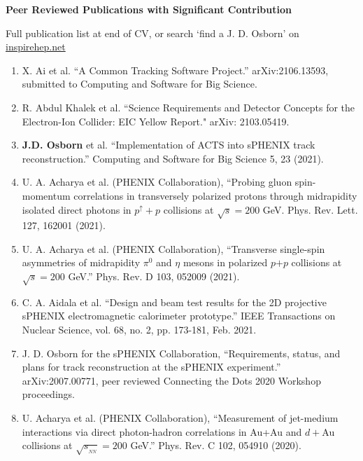 \documentclass[11pt]{article}
\begin{document}
\begin{flushleft}
\LARGE\textbf{Peer Reviewed Publications with Significant Contribution}
\vspace{4pt}

\small 
Full publication list at end of CV, or search `find a J. D. Osborn' on \href{inspirehep.net}{inspirehep.net} 
\begin{center}
\normalsize
\begin{enumerate}
	\item X. Ai et al. ``A Common Tracking Software Project.'' arXiv:2106.13593, submitted to Computing and Software for Big Science.
	
	\item R. Abdul Khalek et al. ``Science Requirements and Detector Concepts for the Electron-Ion Collider: EIC Yellow Report." arXiv: 2103.05419. 
	
	\item {\textbf{J.D. Osborn}} et al. ``Implementation of ACTS into sPHENIX track reconstruction.'' Computing and Software for Big Science 5, 23 (2021).
	
	\item U. A. Acharya et al. (PHENIX Collaboration), ``Probing gluon spin-momentum correlations in transversely polarized protons through midrapidity isolated direct photons in $p^\uparrow+p$ collisions at $\sqrt{s}=200$ GeV. Phys. Rev. Lett. 127, 162001 (2021).
	
	\item U. A. Acharya et al. (PHENIX Collaboration), ``Transverse single-spin asymmetries of midrapidity $\pi^0$ and $\eta$ mesons in polarized $p$$+$$p$ collisions at $\sqrt{s}=200$ GeV.'' Phys. Rev. D 103, 052009 (2021).
	
	\item C. A. Aidala et al. ``Design and beam test results for the 2D projective sPHENIX electromagnetic calorimeter prototype.'' IEEE Transactions on Nuclear Science, vol. 68, no. 2, pp. 173-181, Feb. 2021.
	
	\item J. D. Osborn for the sPHENIX Collaboration, ``Requirements, status, and plans for track reconstruction at the sPHENIX experiment.'' arXiv:2007.00771, peer reviewed Connecting the Dots 2020 Workshop proceedings.
	
	\item U. Acharya et al. (PHENIX Collaboration), ``Measurement of jet-medium interactions via direct photon-hadron correlations in Au+Au and $d+$Au collisions at $\sqrt{s_{_{NN}}}=200$ GeV.'' Phys. Rev. C 102, 054910 (2020).
	

\end{enumerate}
\end{center}
\end{flushleft}
\end{document}
